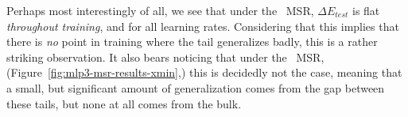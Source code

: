 Perhaps most interestingly of all, we see that under the \TRACELOG~MSR, $\Delta E_{test}$ is flat \emph{throughout 
training}, and for all learning rates. Considering that this implies that there is \emph{no} point in training where the 
\TRACELOG tail generalizes badly, this is a rather striking observation. It also bears noticing that under the 
\POWERLAW~MSR, (Figure~\ref{fig:mlp3-msr-results-xmin},) this is decidedly not the case, meaning that a small, but 
significant amount of generalization comes from the gap between these tails, but none at all comes from the bulk.


\begin{figure}[t]
    \centering
    \\
\end{figure}
